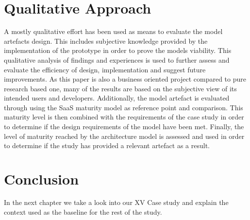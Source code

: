 \section{Qualitative Approach}

A mostly qualitative effort has been used as means to evaluate the model artefacts design. This includes subjective knowledge provided by the implementation of the prototype in order to prove the models viability. This qualitative analysis of findings and experiences is used to further assess and evaluate the efficiency of design, implementation and suggest future improvements. As this paper is also a business oriented project compared to pure research based one, many of the results are based on the subjective view of its intended users and developers. Additionally, the model artefact is evaluated through using the SaaS maturity  model as reference point and comparison. This maturity level is then combined with the requirements of the case study in order to determine if the design requirements of the model have been met. Finally, the level of maturity reached by the architecture model is assessed and used in order to determine if the study has provided a relevant artefact as a result.


\section{Conclusion}

In the next chapter we take a look into our XV Case study and explain the context used as the baseline for the rest of the study.

